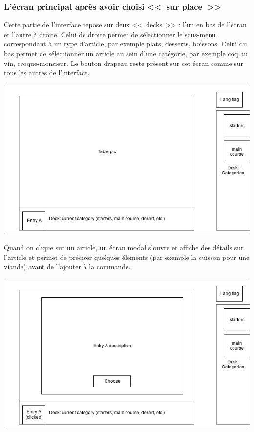 \documentclass[a4paper,12pt]{article}
\begin{document}
\subsubsection{L'écran principal après avoir choisi <<~sur place~>>}

Cette partie de l'interface repose sur deux <<~decks~>> : l'un en bas de l'écran et l'autre à droite. Celui de droite
permet de sélectionner le sous-menu correspondant à un type d'article, par exemple plats, desserts, boissons. Celui
du bas permet de sélectionner un article au sein d'une catégorie, par exemple coq au vin, croque-monsieur. Le bouton
drapeau reste présent sur cet écran comme sur tous les autres de l'interface.

\begin{center}
	\includegraphics[width=\textwidth]{in_place_screen1.jpg}
\end{center}

Quand on clique sur un article, un écran modal s'ouvre et affiche des détails sur l'article et permet de préciser
quelques éléments (par exemple la cuisson pour une viande) avant de l'ajouter à la commande.

\begin{center}
	\includegraphics[width=\textwidth]{in_place_screen2.jpg}
\end{center}
\end{document}
